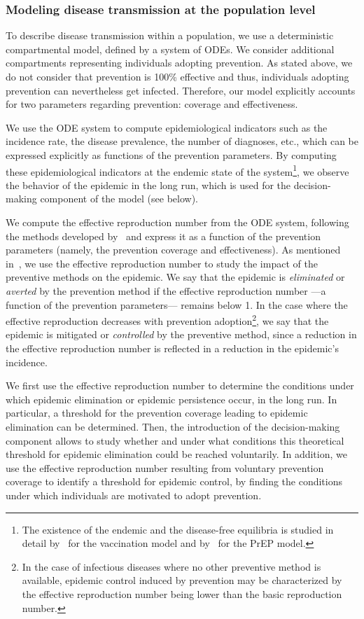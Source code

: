 \subsubsection{Modeling disease transmission at the population level}
To describe disease transmission within a population, we use a deterministic compartmental model, defined by a system of ODEs. We consider additional compartments representing individuals adopting prevention. As stated above, we do not consider that prevention is 100\% effective and thus, individuals adopting prevention can nevertheless get infected. Therefore, our model explicitly accounts for two parameters regarding prevention: coverage and effectiveness.

We use the ODE system to compute epidemiological indicators such as the incidence rate, the disease prevalence, the number of diagnoses, etc., which can be expressed explicitly as functions of the prevention parameters. By computing these epidemiological indicators at the endemic state of the system\footnote{The existence of the endemic and the disease-free equilibria is studied in detail by~\citet{Hethcote2000} for the vaccination model and by~\citet{Jacquez1988} for the PrEP model.}, we observe the behavior of the epidemic in the long run, which is used for the decision-making component of the model (see below). 

We compute the effective reproduction number from the ODE system, following the methods developed by~\citet{VanDenDriessche2002} and express it as a function of the prevention parameters (namely, the prevention coverage and effectiveness). As mentioned in~, we use the effective reproduction number to study the impact of the preventive methods on the epidemic. We say that the epidemic is \textit{eliminated} or \textit{averted} by the prevention method if the effective reproduction number ---a function of the prevention parameters--- remains below 1. In the case where the effective reproduction decreases with prevention adoption\footnote{In the case of infectious diseases where no other preventive method is available, epidemic control induced by prevention may be characterized by the effective reproduction number being lower than the basic reproduction number.}, we say that the epidemic is mitigated or \textit{controlled} by the preventive method, since a reduction in the effective reproduction number is reflected in a reduction in the epidemic's incidence.

We first use the effective reproduction number to determine the conditions under which epidemic elimination or epidemic persistence occur, in the long run. In particular, a threshold for the prevention coverage leading to epidemic elimination can be determined. Then, the introduction of the decision-making component allows to study whether and under what conditions this theoretical threshold for epidemic elimination could be reached voluntarily. In addition, we use the effective reproduction number resulting from voluntary prevention coverage to identify a threshold for epidemic control, by finding the conditions under which individuals are motivated to adopt prevention.

